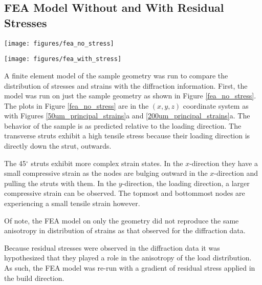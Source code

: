 \subsection{FEA Model Without and With Residual Stresses}
\begin{figure*}
	\texttt{[image: figures/fea\_no\_stress]}
	\caption{Results of the FEA simulation tested using only the material geometry and standard material properties for Ti-5553.}
	\label{fea_no_stress}
\end{figure*}

\begin{figure*}
	\texttt{[image: figures/fea\_with\_stress]}
	\caption{Results of the FEA simulation using the material geometry, the standard material properties for Ti-5553, and a gradient of residual stress applied across the sample in the build direction.}
	\label{fea_with_stress}
\end{figure*}

A finite element model of the sample geometry was run to compare the distribution of stresses and strains with the diffraction information. First, the model was run on just the sample geometry as shown in Figure \ref{fea_no_stress}. The plots in Figure \ref{fea_no_stress} are in the $(x,y,z)$ coordinate system as with Figures \ref{50um_principal_strains}a and \ref{200um_principal_strains}a. The behavior of the sample is as predicted relative to the loading direction. The transverse struts exhibit a high tensile stress because their loading direction is directly down the strut, outwards.

The 45$^\circ$ struts exhibit more complex strain states. In the $x$-direction they have a small compressive strain as the nodes are bulging outward in the $x$-direction and pulling the struts with them. In the $y$-direction, the loading direction, a larger compressive strain can be observed. The topmost and bottommost nodes are experiencing a small tensile strain however.

Of note, the FEA model on only the geometry did not reproduce the same anisotropy in distribution of strains as that observed for the diffraction data. 

Because residual stresses were observed in the diffraction data it was hypothesized that they played a role in the anisotropy of the load distribution. As such, the FEA model was re-run with a gradient of residual stress applied in the build direction.

